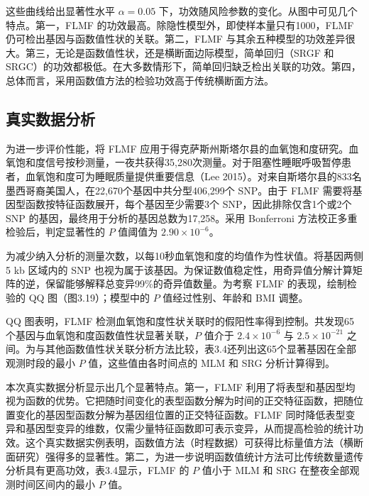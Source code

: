 


这些曲线给出显著性水平 $\alpha=0.05$ 下，功效随风险参数的变化。从图中可见几个特点。第一，FLMF 的功效最高。除隐性模型外，即使样本量只有1000，FLMF 仍可检出基因与函数值性状的关联。第二，FLMF 与其余五种模型的功效差异很大。第三，无论是函数值性状，还是横断面边际模型，简单回归（SRGF 和 SRGC）的功效都极低。在大多数情形下，简单回归缺乏检出关联的功效。第四，总体而言，采用函数值方法的检验功效高于传统横断面方法。
\FloatBarrier

\subsection{真实数据分析}

为进一步评价性能，将 FLMF 应用于得克萨斯州斯塔尔县的血氧饱和度研究。血氧饱和度信号按秒测量，一夜共获得35,280次测量。对于阻塞性睡眠呼吸暂停患者，血氧饱和度可为睡眠质量提供重要信息（Lee 2015）。对来自斯塔尔县的833名墨西哥裔美国人，在22,670个基因中共分型406,299个 SNP。由于 FLMF 需要将基因型函数按特征函数展开，每个基因至少需要3个 SNP，因此排除仅含1个或2个 SNP 的基因，最终用于分析的基因总数为17,258。采用 Bonferroni 方法校正多重检验后，判定显著性的 $P$ 值阈值为 $2.90\times10^{-6}$。

为减少纳入分析的测量次数，以每10秒血氧饱和度的均值作为性状值。将基因两侧5 kb 区域内的 SNP 也视为属于该基因。为保证数值稳定性，用奇异值分解计算矩阵的逆，保留能够解释总变异99\%的奇异值数量。为考察 FLMF 的表现，绘制检验的 QQ 图（图3.19）；模型中的 $P$ 值经过性别、年龄和 BMI 调整。



QQ 图表明，FLMF 检测血氧饱和度性状关联时的假阳性率得到控制。共发现65个基因与血氧饱和度函数值性状显著关联，$P$ 值介于 $2.4\times10^{-6}$ 与 $2.5\times10^{-21}$ 之间。为与其他函数值性状关联分析方法比较，表3.4还列出这65个显著基因在全部观测时段的最小 $P$ 值，这些值由各时间点的 MLM 和 SRG 分析计算得到。

本次真实数据分析显示出几个显著特点。第一，FLMF 利用了将表型和基因型均视为函数的优势。它把随时间变化的表型函数分解为时间的正交特征函数，把随位置变化的基因型函数分解为基因组位置的正交特征函数。FLMF 同时降低表型变异和基因型变异的维数，仅需少量特征函数即可表示变异，从而提高检验的统计功效。这个真实数据实例表明，函数值方法（时程数据）可获得比标量值方法（横断面研究）强得多的显著性。第二，为进一步说明函数值统计方法可比传统数量遗传分析具有更高功效，表3.4显示，FLMF 的 $P$ 值小于 MLM 和 SRG 在整夜全部观测时间区间内的最小 $P$ 值。

